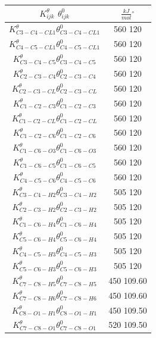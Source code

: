 \begin{table}[!h]
    \centering
    \begin{tabular}{|c|c|}
    \hline
    $K^{\theta}_{ijk}$ $\theta^0_{ijk}$& $\frac{kJ}{mol}$\quad $^{\circ}$\\
    \hline
    $K^{\theta}_{C3-C4-CL1} \theta^0_{C3-C4-CL1}$& 560 120\\
    $K^{\theta}_{C4-C5-CL1} \theta^0_{C4-C5-CL1}$& 560 120\\
    $K^{\theta}_{C3-C4-C5} \theta^0_{C3-C4-C5}$& 560 120\\
    $K^{\theta}_{C2-C3-C4} \theta^0_{C2-C3-C4}$& 560 120\\
    $K^{\theta}_{C2-C3-CL} \theta^0_{C2-C3-CL}$& 560 120\\
    $K^{\theta}_{C1-C2-C3} \theta^0_{C1-C2-C3}$& 560 120\\
    $K^{\theta}_{C1-C2-CL} \theta^0_{C1-C2-CL}$& 560 120\\
    $K^{\theta}_{C1-C2-C6} \theta^0_{C1-C2-C6}$& 560 120\\
    $K^{\theta}_{C1-C6-O3} \theta^0_{C1-C6-O3}$& 560 120\\
    $K^{\theta}_{C1-C6-C5} \theta^0_{C1-C6-C5}$& 560 120\\
    $K^{\theta}_{C4-C5-C6} \theta^0_{C4-C5-C6}$& 560 120\\

    $K^{\theta}_{C3-C4-H2} \theta^0_{C3-C4-H2}$& 505 120\\
    $K^{\theta}_{C2-C3-H2} \theta^0_{C2-C3-H2}$& 505 120\\
    $K^{\theta}_{C1-C6-H4} \theta^0_{C1-C6-H4}$& 505 120\\
    $K^{\theta}_{C5-C6-H4} \theta^0_{C5-C6-H4}$& 505 120\\
    $K^{\theta}_{C4-C5-H3} \theta^0_{C4-C5-H3}$& 505 120\\
    $K^{\theta}_{C5-C6-H3} \theta^0_{C5-C6-H3}$& 505 120\\
    
    $K^{\theta}_{C7-C8-H5} \theta^0_{C7-C8-H5}$& 450 109.60\\
    $K^{\theta}_{C7-C8-H6} \theta^0_{C7-C8-H6}$& 450 109.60\\
    $K^{\theta}_{C8-O1-H1} \theta^0_{C8-O1-H1}$& 450 109.50\\
    $K^{\theta}_{C7-C8-O1} \theta^0_{C7-C8-O1}$& 520 109.50\\
    

\end{tabular}
\end{table}
